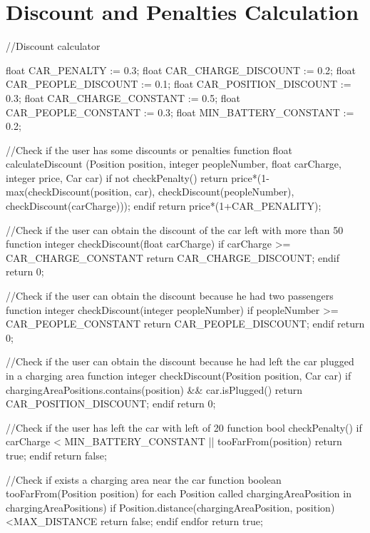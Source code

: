 \documentclass[11pt,a4paper]{report}
\begin{document}
\section{Discount and Penalties Calculation}
\begin{pseudocodeEnv}
//Discount calculator

float CAR_PENALTY := 0.3;
float CAR_CHARGE_DISCOUNT := 0.2;
float CAR_PEOPLE_DISCOUNT := 0.1;
float CAR_POSITION_DISCOUNT := 0.3;
float CAR_CHARGE_CONSTANT := 0.5;
float CAR_PEOPLE_CONSTANT := 0.3;
float MIN_BATTERY_CONSTANT := 0.2;

//Check if the user has some discounts or penalties
function float calculateDiscount (Position position, integer peopleNumber, float carCharge, integer price, Car car){
	if not checkPenalty()
		return price*(1-max(checkDiscount(position, car), checkDiscount(peopleNumber), checkDiscount(carCharge)));
	endif
	return price*(1+CAR_PENALITY);
}

//Check if the user can obtain the discount of the car left with more than 50%
function integer checkDiscount(float carCharge){
	if carCharge >= CAR_CHARGE_CONSTANT
		return CAR_CHARGE_DISCOUNT;
	endif
	return 0;
}

//Check if the user can obtain the discount because he had two passengers
function integer checkDiscount(integer peopleNumber){
	if peopleNumber >= CAR_PEOPLE_CONSTANT
		return CAR_PEOPLE_DISCOUNT;
	endif
	return 0;
}

//Check if the user can obtain the discount because he had left the car plugged in a charging area
function integer checkDiscount(Position position, Car car){
	if chargingAreaPositions.contains(position) && car.isPlugged()
		return CAR_POSITION_DISCOUNT;
	endif
	return 0;
}

//Check if the user has left the car with left of 20%
function bool checkPenalty(){
	if carCharge < MIN_BATTERY_CONSTANT || tooFarFrom(position)
		return true;
	endif
	return false;
}

//Check if exists a charging area near the car
function boolean tooFarFrom(Position position){
	for each Position called chargingAreaPosition in chargingAreaPositions)
		if Position.distance(chargingAreaPosition, position)<MAX_DISTANCE
			return false;
		endif
	endfor
	return true;
}
\end{pseudocodeEnv}
\end{document}
